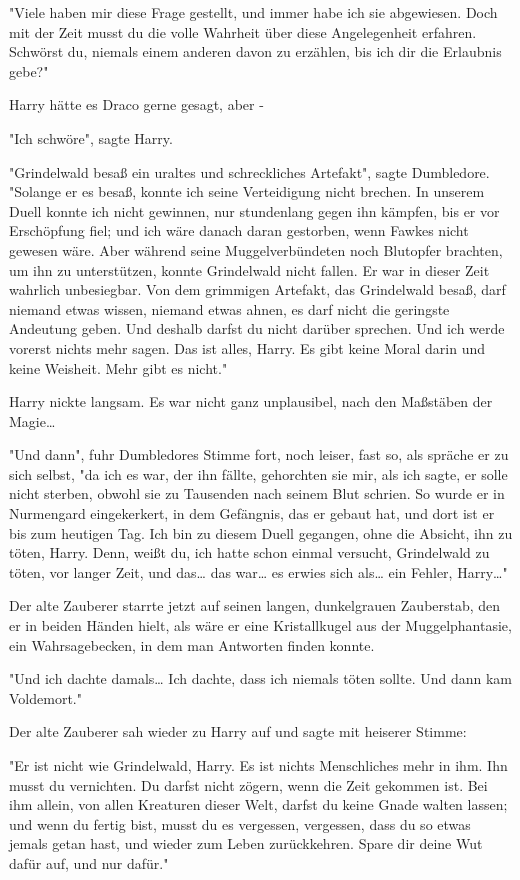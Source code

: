 {"Viele haben mir diese Frage gestellt, und immer habe ich sie abgewiesen. Doch mit der Zeit musst du die volle Wahrheit über diese Angelegenheit erfahren. Schwörst du, niemals einem anderen davon zu erzählen, bis ich dir die Erlaubnis gebe?"

Harry hätte es Draco gerne gesagt, aber -

"Ich schwöre", sagte Harry.

"Grindelwald besaß ein uraltes und schreckliches Artefakt", sagte Dumbledore. "Solange er es besaß, konnte ich seine Verteidigung nicht brechen. In unserem Duell konnte ich nicht gewinnen, nur stundenlang gegen ihn kämpfen, bis er vor Erschöpfung fiel; und ich wäre danach daran gestorben, wenn Fawkes nicht gewesen wäre. Aber während seine Muggelverbündeten noch Blutopfer brachten, um ihn zu unterstützen, konnte Grindelwald nicht fallen. Er war in dieser Zeit wahrlich unbesiegbar. Von dem grimmigen Artefakt, das Grindelwald besaß, darf niemand etwas wissen, niemand etwas ahnen, es darf nicht die geringste Andeutung geben. Und deshalb darfst du nicht darüber sprechen. Und ich werde vorerst nichts mehr sagen. Das ist alles, Harry. Es gibt keine Moral darin und keine Weisheit. Mehr gibt es nicht."

Harry nickte langsam. Es war nicht ganz unplausibel, nach den Maßstäben der Magie…

"Und dann", fuhr Dumbledores Stimme fort, noch leiser, fast so, als spräche er zu sich selbst, "da ich es war, der ihn fällte, gehorchten sie mir, als ich sagte, er solle nicht sterben, obwohl sie zu Tausenden nach seinem Blut schrien. So wurde er in Nurmengard eingekerkert, in dem Gefängnis, das er gebaut hat, und dort ist er bis zum heutigen Tag. Ich bin zu diesem Duell gegangen, ohne die Absicht, ihn zu töten, Harry. Denn, weißt du, ich hatte schon einmal versucht, Grindelwald zu töten, vor langer Zeit, und das… das war… es erwies sich als… ein Fehler, Harry…"

Der alte Zauberer starrte jetzt auf seinen langen, dunkelgrauen Zauberstab, den er in beiden Händen hielt, als wäre er eine Kristallkugel aus der Muggelphantasie, ein Wahrsagebecken, in dem man Antworten finden konnte.

"Und ich dachte damals… Ich dachte, dass ich niemals töten sollte. Und dann kam Voldemort."

Der alte Zauberer sah wieder zu Harry auf und sagte mit heiserer Stimme:

"Er ist nicht wie Grindelwald, Harry. Es ist nichts Menschliches mehr in ihm. Ihn musst du vernichten. Du darfst nicht zögern, wenn die Zeit gekommen ist. Bei ihm allein, von allen Kreaturen dieser Welt, darfst du keine Gnade walten lassen; und wenn du fertig bist, musst du es vergessen, vergessen, dass du so etwas jemals getan hast, und wieder zum Leben zurückkehren. Spare dir deine Wut dafür auf, und nur dafür."

}
